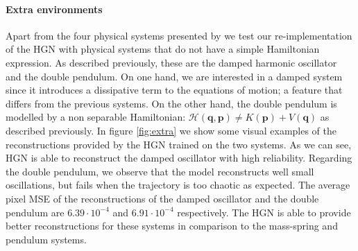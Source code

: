 \paragraph{Extra environments}
Apart from the four physical systems presented by \cite{hgn} we test our re-implementation of the HGN with physical systems that do not have a simple Hamiltonian expression. As described previously, these are the damped harmonic oscillator and the double pendulum. On one hand, we are interested in a damped system since it introduces a dissipative term to the equations of motion; a feature that differs from the previous systems. On the other hand, the double pendulum is modelled by a non separable Hamiltonian: $\mathcal{H}(\textbf{q},\textbf{p}) \neq K(\textbf{p}) + V(\textbf{q})$ as described previously. In figure \ref{fig:extra} we show some visual examples of the reconstructions provided by the HGN trained on the two systems. As we can see, HGN is able to reconstruct the damped oscillator with high reliability. Regarding the double pendulum, we observe that the model reconstructs well small oscillations, but fails when the trajectory is too chaotic as expected. The average pixel MSE of the reconstructions of the damped oscillator and the double pendulum are $6.39\cdot 10^{-4}$ and $6.91\cdot 10^{-4}$ respectively. The HGN is able to provide better reconstructions for these systems in comparison to the mass-spring and pendulum systems.

